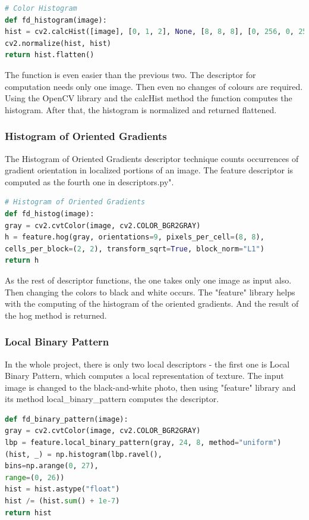 \documentclass[12pt]{article}
\begin{document}
\begin{lstlisting}[language=Python]
# Color Histogram
def fd_histogram(image):
hist = cv2.calcHist([image], [0, 1, 2], None, [8, 8, 8], [0, 256, 0, 256, 0, 256])
cv2.normalize(hist, hist)
return hist.flatten()
\end{lstlisting}

The function is even easier than the previous two. The descriptor for computation needs only one image. Then even no changes of colours are required. Using the OpenCV library and the calcHist method the function computes the histogram. After that, the histogram is normalized and returned flattened.

\subsubsection{Histogram of Oriented Gradients}

The Histogram of Oriented Gradients descriptor technique counts occurrences of gradient orientation in localized portions of an image.
The feature descriptor is computed as the fourth one in descriptors.py".

\begin{lstlisting}[language=Python]
# Histogram of Oriented Gradients
def fd_histog(image):
gray = cv2.cvtColor(image, cv2.COLOR_BGR2GRAY)
h = feature.hog(gray, orientations=9, pixels_per_cell=(8, 8),
cells_per_block=(2, 2), transform_sqrt=True, block_norm="L1")
return h
\end{lstlisting}

As the rest of descriptor functions, the one takes only one image as input also. Then changing the colors to black and white occurs. The "feature" library helps with the computing of the histogram of the oriented gradients. And the result of the hog method is returned.

\subsubsection{Local Binary Pattern}

In the whole project, there is only two local descriptors - the first one is Local Binary Pattern, which computes a local representation of texture.
The input image is changed to the black-and-white photo, then using "feature" library and its method local\_binary\_pattern computes the descriptor.

\begin{lstlisting}[language=Python]
def fd_binary_pattern(image):
gray = cv2.cvtColor(image, cv2.COLOR_BGR2GRAY)
lbp = feature.local_binary_pattern(gray, 24, 8, method="uniform")
(hist, _) = np.histogram(lbp.ravel(),
bins=np.arange(0, 27),
range=(0, 26))
hist = hist.astype("float")
hist /= (hist.sum() + 1e-7)
return hist
\end{lstlisting}
\end{document}

